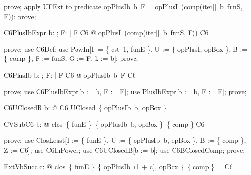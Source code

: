 \documentclass{article}
\begin{document}
\begin{zproof}
prove;
apply UFExt to predicate opPlusIb~b~F = opPlusI~(comp(iter[\nat]~b~funS, F));
prove;
\end{zproof}

\begin{theorem}{C6PlusIbExpr}
  \forall b: \nat; F: \nat \fun \nat | F \in C6 @ opPlusI~(comp(iter[\nat]~b~funS, F)) \in C6
\end{theorem}

\begin{zproof}
prove;
use C6Def;
use PowIn[I := \{ cst~1, funE \}, U := \{ opPlusI, opBox \}, B := \{ comp \}, F := funS, G := F, k := b];
prove;
\end{zproof}

\begin{theorem}{C6PlusIb}
  \forall b: \nat; F: \nat \fun \nat | F \in C6 @ opPlusIb~b~F \in C6
\end{theorem}

\begin{zproof}
prove;
use C6PlusIbExpr[b := b, F := F];
use PlusIbExpr[b := b, F := F];
prove;
\end{zproof}

\begin{theorem}{C6UClosedB}
  \forall b: \nat @ C6 \in UClosed~\{ opPlusIb~b, opBox \}
\end{theorem}


\begin{theorem}{CVSubC6}
  \forall b: \nat @ clos~\{ funE \}~\{ opPlusIb~b, opBox \}~\{ comp \} \subseteq C6
\end{theorem}

\begin{zproof}
prove;
use ClosLeast[I := \{ funE \}, U := \{ opPlusIb~b, opBox \}, B := \{ comp \}, Z := C6];
use C6InPower;
use C6UClosedB[b := b];
use C6BClosedComp;
prove;
\end{zproof}

\begin{theorem}{ExtVbSucc}
  \forall c: \nat @ clos~\{ funE \}~\{ opPlusIb~(1 + c), opBox \}~\{ comp \} = C6
\end{theorem}
\end{document}
